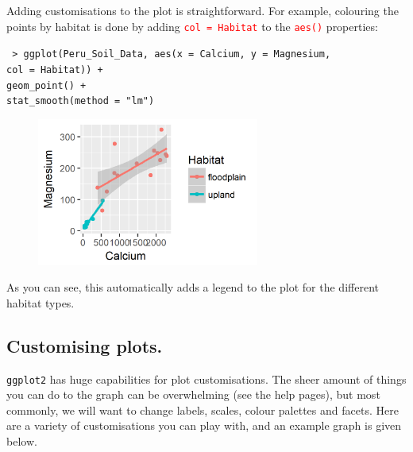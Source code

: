 \documentclass[a4paper,12pt]{article}
\newcommand\code[1]{\textcolor{red}{\texttt{#1}}}
\begin{document}
Adding customisations to the plot is straightforward. For example, colouring the points by habitat is done by adding \code{col = Habitat} to the \code{aes()} properties:

\begin{shaded}
\texttt{ > ggplot(Peru\_Soil\_Data, aes(x = Calcium, y = Magnesium, \\
\hspace*{1cm} col = Habitat)) + \\
\hspace*{1cm} geom\_point() + \\
\hspace*{1cm} stat\_smooth(method = "lm")}
\end{shaded}

\begin{figure}[h]
	\centering
	\includegraphics[width=0.65\textwidth]{figs/fig3.png}
	\label{fig:fig3}
\end{figure}

As you can see, this automatically adds a legend to the plot for the different habitat types.

\subsection{Customising plots.}

\texttt{ggplot2} has huge capabilities for plot customisations. The sheer amount of things you can do to the graph can be overwhelming (see the help pages), but most commonly, we will want to change labels, scales, colour palettes and facets. Here are a variety of customisations you can play with, and an example graph is given below.
\pagebreak
\end{document}

